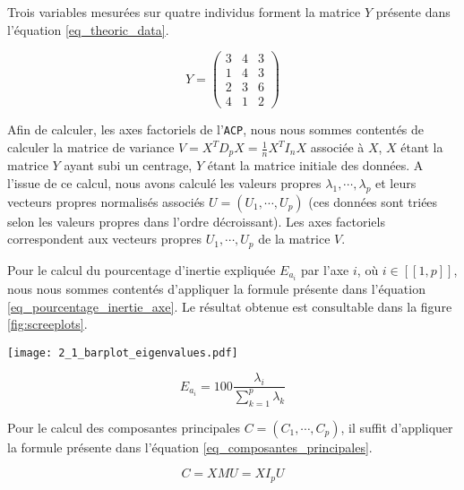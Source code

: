 \documentclass{article}
\begin{document}
\begin{multicols}{2}
Trois variables mesurées sur quatre individus forment la matrice $Y$ présente dans l'équation \ref{eq_theoric_data}.

\begin{equation}
	\label{eq_theoric_data}
    Y = 
    \begin{pmatrix}
      3 & 4 & 3 \\
      1 & 4 & 3 \\
      2 & 3 & 6 \\
      4 & 1 & 2   
    \end{pmatrix}
\end{equation}

Afin de calculer, les axes factoriels de l'\texttt{ACP}, nous nous sommes contentés de calculer la matrice de variance $V = X^T D_p X = \frac{1}{n}X^T I_n X$ associée à $X$, $X$ étant la matrice $Y$ ayant subi un centrage, $Y$ étant la matrice initiale des données. A l'issue de ce calcul, nous avons calculé les valeurs propres $\lambda_1, \cdots, \lambda_p$ et leurs vecteurs propres normalisés associés $U = (U_1, \cdots, U_p)$ (ces données sont triées selon les valeurs propres dans l'ordre décroissant). Les axes factoriels correspondent aux vecteurs propres $U_1, \cdots, U_p$ de la matrice $V$.

Pour le calcul du pourcentage d'inertie expliquée $E_{a_i}$ par l'axe $i$, où $i \in [[1, p]]$, nous nous sommes contentés d'appliquer la formule présente dans l'équation \ref{eq_pourcentage_inertie_axe}. Le résultat obtenue est consultable dans la figure \ref{fig:screeplots}.

\begingroup
    \centering
   \texttt{[image: 2\_1\_barplot\_eigenvalues.pdf]}
    \label{fig:screeplots}
\endgroup

\begin{equation}
\label{eq_pourcentage_inertie_axe}
E_{a_i} = 100 \frac{\lambda_i}{\sum_{k = 1}^{p} \lambda_k}
\end{equation}


Pour le calcul des composantes principales $C = (C_1, \cdots, C_p)$, il suffit d'appliquer la formule présente dans l'équation \ref{eq_composantes_principales}.

\begin{equation}
  \label{eq_composantes_principales}
  C = X M U = X I_p U 
\end{equation}



\end{multicols}
\end{document}
